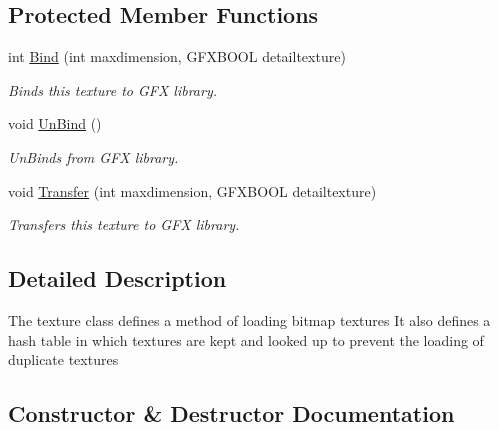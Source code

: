 \subsection*{Protected Member Functions}
\begin{DoxyCompactItemize}
\item 
int \hyperlink{classTexture_ad7796654adb56565345c8c3b72435d9e}{Bind} (int maxdimension, G\+F\+X\+B\+O\+OL detailtexture)\hypertarget{classTexture_ad7796654adb56565345c8c3b72435d9e}{}\label{classTexture_ad7796654adb56565345c8c3b72435d9e}

\begin{DoxyCompactList}\small\item\em Binds this texture to G\+FX library. \end{DoxyCompactList}\item 
void \hyperlink{classTexture_a33fc12d5a64480dc06dba802f77b7482}{Un\+Bind} ()\hypertarget{classTexture_a33fc12d5a64480dc06dba802f77b7482}{}\label{classTexture_a33fc12d5a64480dc06dba802f77b7482}

\begin{DoxyCompactList}\small\item\em Un\+Binds from G\+FX library. \end{DoxyCompactList}\item 
void \hyperlink{classTexture_a6e958c2bef6f438f357bb4a3764fe478}{Transfer} (int maxdimension, G\+F\+X\+B\+O\+OL detailtexture)\hypertarget{classTexture_a6e958c2bef6f438f357bb4a3764fe478}{}\label{classTexture_a6e958c2bef6f438f357bb4a3764fe478}

\begin{DoxyCompactList}\small\item\em Transfers this texture to G\+FX library. \end{DoxyCompactList}\end{DoxyCompactItemize}


\subsection{Detailed Description}
The texture class defines a method of loading bitmap textures It also defines a hash table in which textures are kept and looked up to prevent the loading of duplicate textures 

\subsection{Constructor \& Destructor Documentation}
